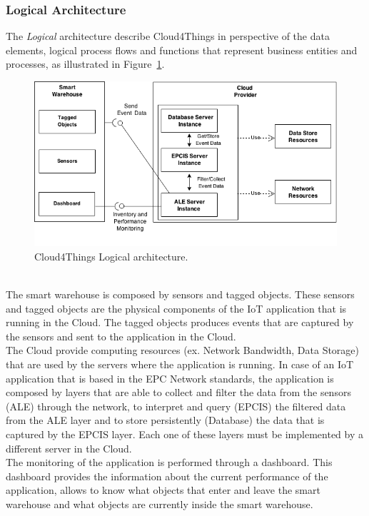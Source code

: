 \subsubsection{Logical Architecture}
\label{subs:logical_architecture}
The \textit{Logical} architecture describe Cloud4Things in perspective of
the data elements, logical process flows and functions that represent business
entities and processes, as illustrated in Figure~\ref{fig:logical_architecture}.
\begin{figure}[h!]
  \centering
  \includegraphics[width=\textwidth]{./images/logical-architecture}
  \caption{Cloud4Things Logical architecture.}
  \label{fig:logical_architecture}
  \end{figure}\\
The smart warehouse is composed by sensors and tagged objects. These sensors and tagged
objects are the physical components of the IoT application that is running in the Cloud.
The tagged objects produces events that are captured by the sensors and sent to the
application in the Cloud.\\

The Cloud provide computing resources (ex. Network Bandwidth, Data Storage) that
are used by the servers where the application is running. In case of an IoT
application that is based in the EPC Network standards, the application is composed
by layers that are able to collect and filter the data from the sensors (ALE) through
the network, to interpret and query (EPCIS) the filtered data from the ALE layer and
to store persistently (Database) the data that is captured by the EPCIS layer.
Each one of these layers must be implemented by a different server in the Cloud.\\

The monitoring of the application is performed through a dashboard. This dashboard
provides the information about the current performance of the application,
allows to know what objects that enter and leave the smart warehouse and what
objects are currently inside the smart warehouse.

